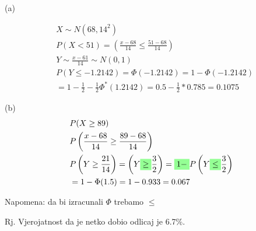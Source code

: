 \documentclass{report}
\newcommand{\highlight}[1]{%
  \colorbox{green!42}{$\displaystyle#1$}}
\theoremstyle{plain}
\begin{document}
(a) 

\begin{align*}
& X \sim N\left(68, 14^2\right) \\
& P(X<51) = \left(\frac{x-68}{14}\leq \frac{51-68}{14}\right) \\
& Y \sim \frac{x-61}{14} \sim N(0,1) \\
& P(Y\leq-1.2142) = \Phi(-1.2142) = 1-\Phi(-1.2142) \\
&= 1-\frac{1}{2}-\frac{1}{2}\Phi^*(1.2142) = 0.5-\frac{1}{2}*0.785=0.1075
\end{align*}

(b)
\begin{align*}
    & P(X\geq 89) \\
    & P\left(\frac{x-68}{14} \geq \frac{89-68}{14}\right) \\
    & P\left(Y\geq \frac{21}{14}\right) = \left(Y \highlight{\geq} \frac{3}{2}\right) = \highlight{1 -} P \left(Y \highlight{\leq} \frac{3}{2}\right) \\
    &= 1 - \Phi(1.5) = 1-0.933=0.067 \\
\end{align*}

Napomena: da bi izracunali $\Phi$ trebamo $\leq$

Rj. Vjerojatnost da je netko dobio odlicaj je 6.7\%.
\end{document}
